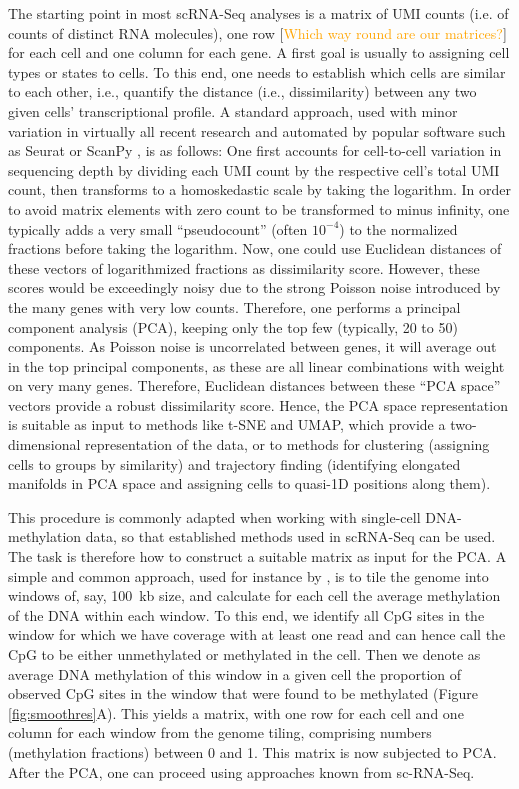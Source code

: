 \documentclass[twocolumn,10pt]{article}
\newcommand{\todo}[1]{[\textcolor{orange}{#1}]}
\begin{document}
The starting point in most scRNA-Seq analyses is a matrix of UMI counts (i.e. of counts of distinct RNA molecules), one row \todo{Which way round are our matrices?} for each cell and one column for each gene. A first goal is usually to assigning cell types or states to cells. To this end, one needs to establish which cells are similar to each other, i.e., quantify the distance (i.e., dissimilarity) between any two given cells' transcriptional profile. A standard approach, used with minor variation in virtually all recent research and automated by popular software such as Seurat \citep{Hao_2021} or ScanPy \citep{Wolf_2018}, is as follows: One first accounts for cell-to-cell variation in sequencing depth by dividing each UMI count by the respective cell's total UMI count, then transforms to a homoskedastic scale by taking the logarithm. In order to avoid matrix elements with zero count to be transformed to minus infinity, one typically adds a very small ``pseudocount'' (often $10^{-4}$) to the normalized fractions before taking the logarithm. Now, one could use Euclidean distances of these vectors of logarithmized fractions as dissimilarity score. However, these scores would be exceedingly noisy due to the strong Poisson noise introduced by the many genes with very low counts. Therefore, one performs a principal component analysis (PCA), keeping only the top few (typically, 20 to 50) components. As Poisson noise is uncorrelated between genes, it will average out in the top principal components, as these are all linear combinations with weight on very many genes. Therefore, Euclidean distances between these ``PCA space'' vectors provide a robust dissimilarity score. Hence, the PCA space representation is suitable as input to methods like t-SNE and UMAP, which provide a two-dimensional representation of the data, or to methods for clustering (assigning cells to groups by similarity) and trajectory finding (identifying elongated manifolds in PCA space and assigning cells to quasi-1D positions along them).

This procedure is commonly adapted when working with single-cell DNA-methylation data, so that established methods used in scRNA-Seq can be used.
The task is therefore how to construct a suitable matrix as input for the PCA. A simple and common approach, used for instance by \citet{luo2017single}, is to tile the genome into windows of, say, 100~kb size, and calculate for each cell the average methylation of the DNA within each window. To this end, we identify all CpG sites in the window for which we have coverage with at least one read and can hence call the CpG to be either unmethylated or methylated in the cell. Then we denote as average DNA methylation of this window in a given cell the proportion of observed CpG sites in the window that were found to be methylated (Figure \ref{fig:smoothres}A). This yields a matrix, with one row for each cell and one column for each window from the genome tiling, comprising numbers (methylation fractions) between 0 and 1. This matrix is now subjected to PCA. After the PCA, one can proceed using approaches known from sc-RNA-Seq.
\end{document}
